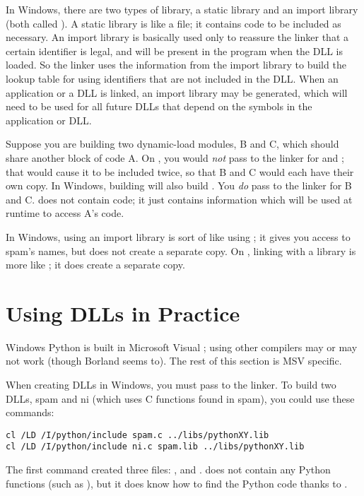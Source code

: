In Windows, there are two types of library, a static library and an
import library (both called ).  A static library is like a
\UNIX{}  file; it contains code to be included as necessary.
An import library is basically used only to reassure the linker that a
certain identifier is legal, and will be present in the program when
the DLL is loaded.  So the linker uses the information from the
import library to build the lookup table for using identifiers that
are not included in the DLL.  When an application or a DLL is linked,
an import library may be generated, which will need to be used for all
future DLLs that depend on the symbols in the application or DLL.

Suppose you are building two dynamic-load modules, B and C, which should
share another block of code A.  On \UNIX, you would \emph{not} pass
 to the linker for  and ; that would
cause it to be included twice, so that B and C would each have their
own copy.  In Windows, building  will also build
.  You \emph{do} pass  to the linker for B and
C.   does not contain code; it just contains information
which will be used at runtime to access A's code.  

In Windows, using an import library is sort of like using ; it gives you access to spam's names, but does not create a
separate copy.  On \UNIX, linking with a library is more like
; it does create a separate copy.


\section{Using DLLs in Practice \label{win-dlls}}

Windows Python is built in Microsoft Visual \Cpp; using other
compilers may or may not work (though Borland seems to).  The rest of
this section is MSV\Cpp{} specific.

When creating DLLs in Windows, you must pass  to
the linker.  To build two DLLs, spam and ni (which uses C functions
found in spam), you could use these commands:

\begin{verbatim}
cl /LD /I/python/include spam.c ../libs/pythonXY.lib
cl /LD /I/python/include ni.c spam.lib ../libs/pythonXY.lib
\end{verbatim}

The first command created three files: ,
 and .   does not contain
any Python functions (such as ), but it
does know how to find the Python code thanks to .

